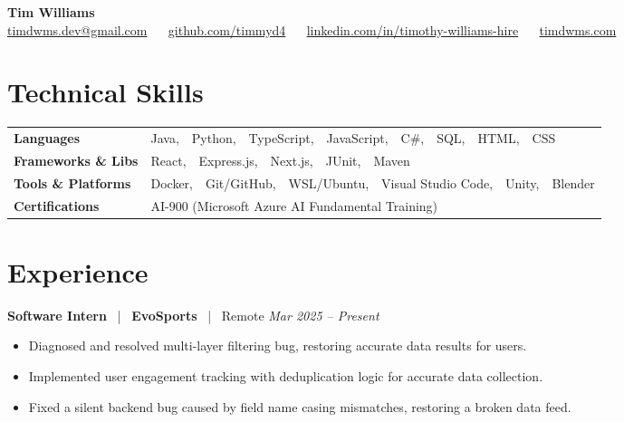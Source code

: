 \documentclass[10pt, letterpaper]{article}
\newcommand{\jobhead}[4]{%
  \vspace{5pt}%
  {\bfseries\color{dark}#1}%
  ~{\color{light}|}~%
  {\bfseries\color{navy}#2}%
  ~{\color{light}|}~%
  {\color{light}#3}%
  \hfill{\color{light}\small\textit{#4}}\\[-2pt]%
}
\newcommand{\skillrow}[2]{%
  {\bfseries #1} & #2 \\[2pt]%
}
\begin{document}

\begin{center}
  {\huge\bfseries\color{navy} Tim Williams}\\[4pt]
  {\small\color{light}
    \href{mailto:timdwms.dev@gmail.com}{timdwms.dev@gmail.com}
    ~\textbullet~
    \href{https://github.com/timmyd4}{github.com/timmyd4}
    ~\textbullet~
    \href{https://www.linkedin.com/in/timothy-williams-hire}{linkedin.com/in/timothy-williams-hire}
    ~\textbullet~
    \href{https://timdwms.com}{timdwms.com}
  }
\end{center}

\vspace{2pt}

\section{Technical Skills}

\begin{tabular}{@{}p{1.6in} p{5.2in}@{}}
  \skillrow{Languages}{Java,\ \ Python,\ \ TypeScript,\ \ JavaScript,\ \ C\#,\ \ SQL,\ \ HTML,\ \ CSS}
  \skillrow{Frameworks \& Libs}{React,\ \ Express.js,\ \ Next.js,\ \ JUnit,\ \ Maven}
  \skillrow{Tools \& Platforms}{Docker,\ \ Git/GitHub,\ \ WSL/Ubuntu,\ \ Visual Studio Code,\ \ Unity,\ \ Blender}
  \skillrow{Certifications}{AI-900 (Microsoft Azure AI Fundamental Training)}
\end{tabular}

\section{Experience}

\jobhead{Software Intern}{EvoSports}{Remote}{Mar 2025 – Present}
\begin{itemize}
  \item Diagnosed and resolved multi-layer filtering bug, restoring accurate data results for users.
  \item Implemented user engagement tracking with deduplication logic for accurate data collection.
  \item Fixed a silent backend bug caused by field name casing mismatches, restoring a broken data feed.
\end{itemize}
\end{document}
